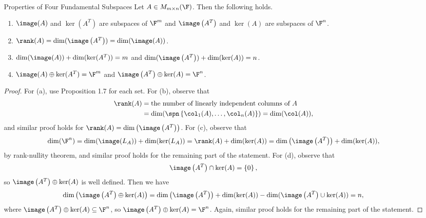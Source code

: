 \documentclass[linearalgebra]{subfiles}
\begin{document}
    \begin{prop}{Properties of Four Fundamental Subspaces}
        Let $A\in M_{m\times n}(\F)$. Then the following holds.
        \begin{enumerate}
            \item $\image(A)$ and $\ker(A^T)$ are subspaces of $\F^m$ and $\image\left( A^{T}  \right) $ and $\ker(A)$ are subspaces of $\F^n$.
            \item $\rank(A) = \dim (\image\left( A^{T}  \right) ) = \dim (\image(A))$.
            \item $\dim (\image(A)) + \dim (\ker( A^T)) = m$ and $\dim (\image\left( A^{T}  \right) ) + \dim (\ker(A)) = n$.
            \item $\image(A) \oplus \ker(A^T) = \F^m$ and $\image\left( A^{T} \right)  \oplus \ker(A) = \F^n$.
        \end{enumerate}
    \end{prop}

    \begin{proof}
        For (a), use Proposition 1.7 for each set. For (b), observe that
        \begin{align*}
            \rank(A) & = \text{the number of linearly independent columns of }A \\
                    & = \dim (\spn \left\lbrace \col_1(A), \ldots, \col_n(A) \right\rbrace) = \dim (\col (A)),
        \end{align*} 
        and similar proof holds for $\rank(A) = \dim \left( \image\left( A^{T}  \right)  \right) $. For (c), observe that
        \begin{equation*}
            \dim (\F^n) = \dim (\image(L_A)) + \dim (\ker(L_A)) = \rank(A) + \dim (\ker (A)) = \dim \left( \image\left( A^{T} \right)  \right)  + \dim (\ker(A)),
        \end{equation*}
        by rank-nullity theorem, and similar proof holds for the remaining part of the statement. For (d), observe that
        \begin{equation*}
            \image\left( A^{T} \right)  \cap \ker(A) = \left\lbrace 0 \right\rbrace,
        \end{equation*}
        so $\image\left( A^{T} \right) \oplus \ker(A)$ is well defined. Then we have
        \begin{equation*}
            \dim \left(\image\left( A^{T}  \right)  \oplus \ker(A)\right) = \dim \left( \image\left( A^{T} \right)  \right)  + \dim (\ker(A)) - \dim (\image\left( A^{T}  \right)  \cup \ker(A)) = n,
        \end{equation*}
        where $\image\left( A^{T} \right)  \oplus \ker(A)\subseteq \F^n$, so $\image\left( A^{T} \right)  \oplus \ker(A) = \F^n$. Again, similar proof holds for the remaining part of the statement.
    \end{proof}
\end{document}
